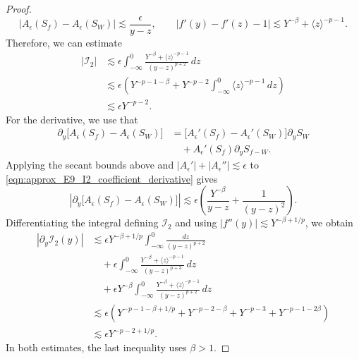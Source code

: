 \documentclass[11pt]{amsart}
\theoremstyle{definition}
\theoremstyle{remark}
\numberwithin{equation}{section}
\newcommand{\mc}[1]{\mathcal{#1}}
\newcommand{\ang}[1]{\langle #1 \rangle}
\begin{document}
\begin{proof}
    \[|A_\epsilon(S_f)-A_\epsilon(S_W)|\lesssim\frac{\epsilon}{y-z},\qquad
    |f'(y)-f'(z)-1|\lesssim Y^{-\beta}+\ang{z}^{-p-1}.\]
    Therefore, we can estimate
    \begin{align*}
        |\mc{I}_2|
        &\lesssim\epsilon\int_{-\infty}^0\frac{Y^{-\beta}+\ang{z}^{-p-1}}{(y-z)^{p+2}}\,dz\\
        &\lesssim\epsilon\left(Y^{-p-1-\beta}+Y^{-p-2}\int_{-\infty}^0\ang{z}^{-p-1}\,dz\right)\\
        &\lesssim\epsilon Y^{-p-2}.
    \end{align*}
    For the derivative, we use that
    \begin{equation}\label{eqn:approx_E9_I2_coefficient_derivative}
        \begin{aligned}
            \partial_y\bigl[A_\epsilon(S_f)-A_\epsilon(S_W)\bigr]
            & = \bigl[A_\epsilon'(S_f)-A_\epsilon'(S_W)\bigr]\partial_yS_W\\
            & \quad+A_\epsilon'(S_f)\partial_yS_{f-W}.
        \end{aligned}
    \end{equation}
    Applying the secant bounds above and $|A_\epsilon'|+|A_\epsilon''|\lesssim\epsilon$ to \eqref{eqn:approx_E9_I2_coefficient_derivative} gives
    \[\left|\partial_y\bigl[A_\epsilon(S_f)-A_\epsilon(S_W)\bigr]\right|
    \lesssim\epsilon\left(\frac{Y^{-\beta}}{y-z}+\frac{1}{(y-z)^2}\right).\]
    Differentiating the integral defining $\mc{I}_2$ and using $|f''(y)|\lesssim Y^{-\beta+1/p}$, we obtain
    \begin{align*}
        |\partial_y\mc{I}_2(y)|
        &\lesssim\epsilon Y^{-\beta+1/p}\int_{-\infty}^0\frac{dz}{(y-z)^{p+2}}\\
        &\quad+\epsilon\int_{-\infty}^0\frac{Y^{-\beta}+\ang{z}^{-p-1}}{(y-z)^{p+3}}\,dz\\
        &\quad+\epsilon Y^{-\beta}\int_{-\infty}^0\frac{Y^{-\beta}+\ang{z}^{-p-1}}{(y-z)^{p+2}}\,dz\\
        &\lesssim\epsilon\left(Y^{-p-1-\beta+1/p}+Y^{-p-2-\beta}+Y^{-p-3}+Y^{-p-1-2\beta}\right)\\
        &\lesssim\epsilon Y^{-p-2+1/p}.
    \end{align*}
    In both estimates, the last inequality uses $\beta>1$.


\end{proof}
\end{document}
